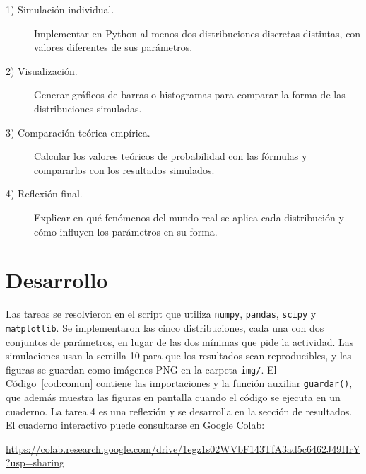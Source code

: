 \documentclass[11pt,letterpaper]{article}
\begin{document}
\begin{description}
    \item[1) Simulación individual.] Implementar en Python al menos dos distribuciones discretas distintas, con valores diferentes de sus parámetros.
    \item[2) Visualización.] Generar gráficos de barras o histogramas para comparar la forma de las distribuciones simuladas.
    \item[3) Comparación teórica-empírica.] Calcular los valores teóricos de probabilidad con las fórmulas y compararlos con los resultados simulados.
    \item[4) Reflexión final.] Explicar en qué fenómenos del mundo real se aplica cada distribución y cómo influyen los parámetros en su forma.
\end{description}

\section{Desarrollo}

Las tareas se resolvieron en el script que utiliza \texttt{numpy}, \texttt{pandas}, \texttt{scipy} y \texttt{matplotlib}. Se implementaron las cinco distribuciones, cada una con dos conjuntos de parámetros, en lugar de las dos mínimas que pide la actividad. Las simulaciones usan la semilla 10 para que los resultados sean reproducibles, y las figuras se guardan como imágenes PNG en la carpeta \texttt{img/}. El Código~\ref{cod:comun} contiene las importaciones y la función auxiliar \texttt{guardar()}, que además muestra las figuras en pantalla cuando el código se ejecuta en un cuaderno. La tarea 4 es una reflexión y se desarrolla en la sección de resultados. El cuaderno interactivo puede consultarse en Google Colab:

\begin{center}
    \url{https://colab.research.google.com/drive/1egz1s02WVbF143TfA3ad5c6462J49HrY?usp=sharing}
\end{center}
\end{document}
